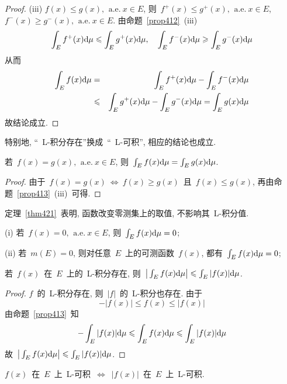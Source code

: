 \begin{proof}
(iii) $f(x) \leqslant g(x),\, \mathrm{~a.e.~} x \in E$, 则~$f^+(x) \leqslant g^+(x),\, \mathrm{~a.e.~} x \in E$, $f^-(x) \geqslant g^-(x),\, \mathrm{~a.e.~} x \in E$. 由命题~\ref{prop412}~(iii)
\[
\int_E f^+(x) \mathrm{d} \mu \leqslant \int_E g^+(x) \mathrm{d} \mu, \quad \int_E f^-(x) \mathrm{d} \mu \geqslant \int_E g^-(x) \mathrm{d} \mu
\]
从而
\begin{eqnarray*}
\int_E f(x) \mathrm{d} \mu &=& \int_E f^+(x) \mathrm{d} \mu - \int_E f^-(x) \mathrm{d} \mu \\
&\leqslant& \int_E g^+(x) \mathrm{d} \mu - \int_E g^-(x) \mathrm{d} \mu = \int_E g(x) \mathrm{d} \mu
\end{eqnarray*}
故结论成立.
\end{proof}

\begin{remark}
特别地, ``~L-积分存在''换成~``~L-可积'', 相应的结论也成立.
\end{remark}

\begin{theorem} \label{thm421}
若~$f(x) = g(x),\, \mathrm{~a.e.~} x \in E$, 则~$\int_E f(x) \mathrm{d} \mu = \int_E g(x) \mathrm{d} \mu$.
\end{theorem}

\begin{proof}
由于~$f(x) = g(x)~\Leftrightarrow~f(x) \geqslant g(x)$~且~$f(x) \leqslant g(x)$,  再由命题~\ref{prop413}~(iii)~可得.
\end{proof}

定理~\ref{thm421}~表明, 函数改变零测集上的取值, 不影响其~L-积分值.

\begin{corollary}
(i) 若~$f(x) = 0,\, \mathrm{~a.e.~} x \in E$, 则~$\int_E f(x) \mathrm{d} \mu = 0$;

(ii) 若~$m(E) = 0$, 则对任意~$E$~上的可测函数~$f(x)$, 都有~$\int_E f(x) \mathrm{d} \mu = 0$;
\end{corollary}

\begin{proposition}
若~$f(x)$~在~$E$~上的~L-积分存在, 则~$\big| \int_E f(x) \mathrm{d} \mu \big| \leqslant \int_E |f(x)| \mathrm{d} \mu$.
\end{proposition}

\begin{proof}
$f$~的~L-积分存在, 则~$|f|$~的~L-积分也存在. 由于
\[
-|f(x)| \leqslant f(x) \leqslant |f(x)|
\]
由命题~\ref{prop413}~知
\[
-\int_E |f(x)| \mathrm{d} \mu \leqslant \int_E f(x) \mathrm{d} \mu \leqslant \int_E |f(x)| \mathrm{d} \mu
\]
故~$\big| \int_E f(x) \mathrm{d} \mu \big| \leqslant \int_E |f(x)| \mathrm{d} \mu$.
\end{proof}

\begin{theorem} \label{thm422}
$f(x)$~在~$E$~上~L-可积~$\Leftrightarrow$~$|f(x)|$~在~$E$~上~L-可积.
\end{theorem}

